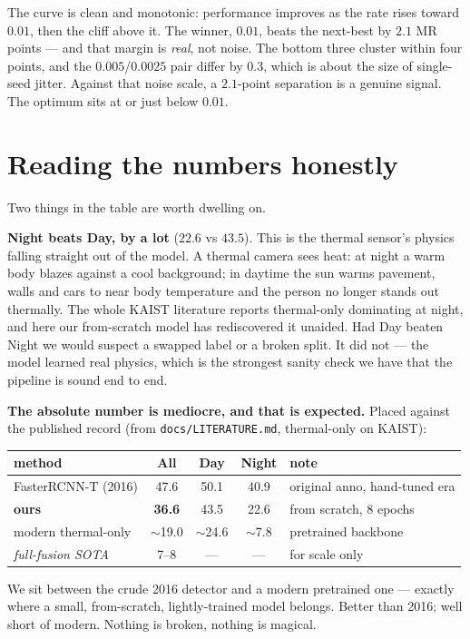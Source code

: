 \documentclass[../main.tex]{subfiles}
\begin{document}
The curve is clean and monotonic: performance improves as the rate rises toward $0.01$, then the
cliff above it. The winner, $0.01$, beats the next-best by $2.1$ MR points --- and that margin is
\emph{real}, not noise. The bottom three cluster within four points, and the $0.005$/$0.0025$ pair
differ by $0.3$, which is about the size of single-seed jitter. Against that noise scale, a
$2.1$-point separation is a genuine signal. The optimum sits at or just below $0.01$.

\section{Reading the numbers honestly}

Two things in the table are worth dwelling on.

\textbf{Night beats Day, by a lot} ($22.6$ vs $43.5$). This is the thermal sensor's physics falling
straight out of the model. A thermal camera sees heat: at night a warm body blazes against a cool
background; in daytime the sun warms pavement, walls and cars to near body temperature and the
person no longer stands out thermally. The whole KAIST literature reports thermal-only dominating
at night, and here our from-scratch model has rediscovered it unaided. Had Day beaten Night we would
suspect a swapped label or a broken split. It did not --- the model learned real physics, which is
the strongest sanity check we have that the pipeline is sound end to end.

\textbf{The absolute number is mediocre, and that is expected.} Placed against the published record
(from \texttt{docs/LITERATURE.md}, thermal-only on KAIST):

\begin{center}
\begin{tabular}{lcccl}
\toprule
method & All & Day & Night & note \\
\midrule
FasterRCNN-T (2016) & 47.6 & 50.1 & 40.9 & original anno, hand-tuned era \\
\textbf{ours} & \textbf{36.6} & 43.5 & 22.6 & from scratch, 8 epochs \\
modern thermal-only & $\sim$19.0 & $\sim$24.6 & $\sim$7.8 & pretrained backbone \\
\emph{full-fusion SOTA} & 7--8 & --- & --- & for scale only \\
\bottomrule
\end{tabular}
\end{center}

We sit between the crude 2016 detector and a modern pretrained one --- exactly where a small,
from-scratch, lightly-trained model belongs. Better than 2016; well short of modern. Nothing is
broken, nothing is magical.
\end{document}
